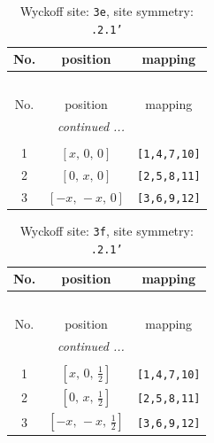 \documentclass[fleqn,8pt]{jsarticle}
\begin{document}
\begin{longtable}{ccc}
\caption{Wyckoff site: {\tt 3e}, site symmetry: {\tt .2.1'}}
 \\
 \hline \hline
No. & position & mapping \\ \hline \endfirsthead

\multicolumn{2}{l}{\tablename\ \thetable{}} \\
 \hline \hline
No. & position & mapping \\ \hline \endhead

 \hline \hline
\multicolumn{2}{r}{\footnotesize\it continued ...} \\ \endfoot

 \hline \hline
\multicolumn{2}{r}{} \\ \endlastfoot

1 & $\left[ x,\, 0,\, 0 \right]$ & {\tt [1,4,7,10]} \\ \hline
2 & $\left[ 0,\, x,\, 0 \right]$ & {\tt [2,5,8,11]} \\ \hline
3 & $\left[ - x,\, - x,\, 0 \right]$ & {\tt [3,6,9,12]} \\
\end{longtable}
\renewcommand{\arraystretch}{1.2}
\begin{longtable}{ccc}
\caption{Wyckoff site: {\tt 3f}, site symmetry: {\tt .2.1'}}
 \\
 \hline \hline
No. & position & mapping \\ \hline \endfirsthead

\multicolumn{2}{l}{\tablename\ \thetable{}} \\
 \hline \hline
No. & position & mapping \\ \hline \endhead

 \hline \hline
\multicolumn{2}{r}{\footnotesize\it continued ...} \\ \endfoot

 \hline \hline
\multicolumn{2}{r}{} \\ \endlastfoot

1 & $\left[ x,\, 0,\, \frac{1}{2} \right]$ & {\tt [1,4,7,10]} \\ \hline
2 & $\left[ 0,\, x,\, \frac{1}{2} \right]$ & {\tt [2,5,8,11]} \\ \hline
3 & $\left[ - x,\, - x,\, \frac{1}{2} \right]$ & {\tt [3,6,9,12]} \\
\end{longtable}
\renewcommand{\arraystretch}{1.2}
\end{document}
